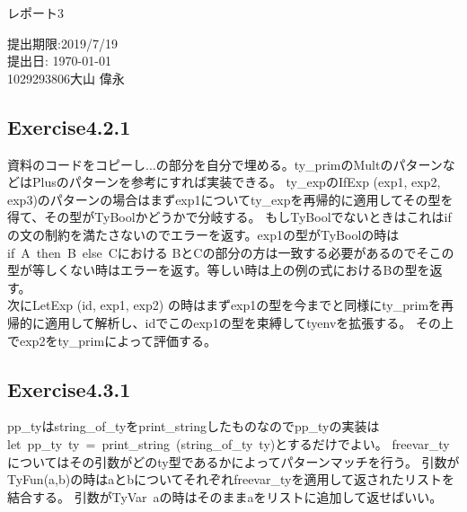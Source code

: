 \documentclass[a4paper,11pt,oneside,openany]{jsarticle}
\begin{document}
    \begin{center}

      \vspace*{35mm}
      \huge レポート3 \par
      \vspace{90mm}
      \Large 提出期限:2019/7/19\\
       提出日: \today \\
      \vspace{15mm}
      \Large
       1029293806\hspace{5mm}大山 偉永\par

      \vspace{10mm}
    \end{center}
    \clearpage
    \addtocounter{page}{-1}

    \newpage

\subsection{Exercise4.2.1}
    資料のコードをコピーし...の部分を自分で埋める。ty\_primのMultのパターンなどはPlusのパターンを参考にすれば実装できる。
    ty\_expのIfExp (exp1, exp2, exp3)のパターンの場合はまずexp1についてty_expを再帰的に適用してその型を得て、その型がTyBoolかどうかで分岐する。
    もしTyBoolでないときはこれはifの文の制約を満たさないのでエラーを返す。exp1の型がTyBoolの時はif\ A\ then\ B\ else\ Cにおける
    BとCの部分の方は一致する必要があるのでそこの型が等しくない時はエラーを返す。等しい時は上の例の式におけるBの型を返す。\\
    次にLetExp (id, exp1, exp2) の時はまずexp1の型を今までと同様にty\_primを再帰的に適用して解析し、idでこのexp1の型を束縛してtyenvを拡張する。
    その上でexp2をty\_primによって評価する。    

    

\subsection{Exercise4.3.1}
    pp\_tyはstring\_of\_tyをprint\_stringしたものなのでpp\_tyの実装はlet\ pp\_ty\ ty\  =\ print\_string\  (string\_of\_ty\ ty)とするだけでよい。
    freevar\_tyについてはその引数がどのty型であるかによってパターンマッチを行う。
    引数がTyFun(a,b)の時はaとbについてそれぞれfreevar\_tyを適用して返されたリストを結合する。
    引数がTyVar\ aの時はそのままaをリストに追加して返せばいい。
   
    
\end{document}
